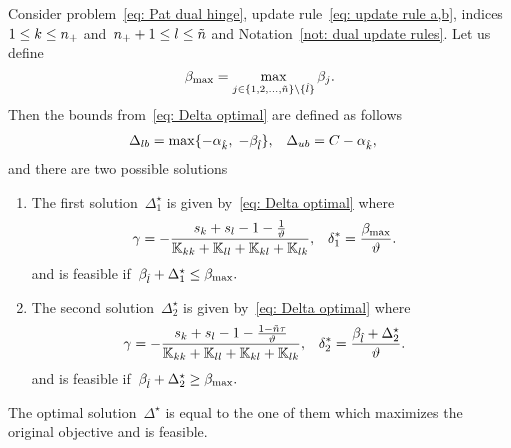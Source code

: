 \begin{lemma}
  Consider problem~\eqref{eq: Pat dual hinge}, update rule~\eqref{eq: update rule a,b}, indices~$1 \leq k \leq n_{+}$ and~$n_{+} + 1 \leq l \leq \tilde{n}$  and Notation~\ref{not: dual update rules}. Let us define
  \begin{equation*}
    \beta_{\max} = \max_{j \in \{1, 2, \ldots, \tilde{n} \} \setminus \{\hat{l}\}} \beta_j.
  \end{equation*}
  Then the bounds from~\eqref{eq: Delta optimal} are defined as follows
  \begin{align*}
    \Delta_{lb} & = \max\{- \alpha_{\hat{k}},\; -\beta_{\hat{l}} \}, &
    \Delta_{ub} & = C - \alpha_{\hat{k}},
  \end{align*}
  and there are two possible solutions
  \begin{enumerate}
    \item The first solution~$\Delta^{\star}_1$ is given by~\eqref{eq: Delta optimal} where
    \begin{align*}
      \gamma
        & = -\frac{s_k + s_l - 1 - \frac{1}{\vartheta}}{\mathbb{K}_{kk} + \mathbb{K}_{ll} + \mathbb{K}_{kl} + \mathbb{K}_{lk}}, &
      \delta^{*}_1
        & = \frac{\beta_{\max}}{\vartheta}.
    \end{align*}
    and is feasible if~$\beta_{\hat{l}} + \Delta^{\star}_1 \leq \beta_{\max}.$
    \item The second solution~$\Delta^{\star}_2$ is given by~\eqref{eq: Delta optimal} where
    \begin{align*}
      \gamma
        & = -\frac{s_k + s_l - 1 - \frac{1 - \tilde{n} \tau}{\vartheta}}{\mathbb{K}_{kk} + \mathbb{K}_{ll} + \mathbb{K}_{kl} + \mathbb{K}_{lk}}, &
      \delta^{*}_2
        & = \frac{\beta_{\hat{l}} + \Delta^{\star}_2}{\vartheta}.
    \end{align*}
    and is feasible if~$\beta_{\hat{l}} + \Delta^{\star}_2 \geq \beta_{\max}.$
  \end{enumerate}
  The optimal solution~$\Delta^{\star}$ is equal to the one of them which maximizes the original objective and is feasible.
\end{lemma}


